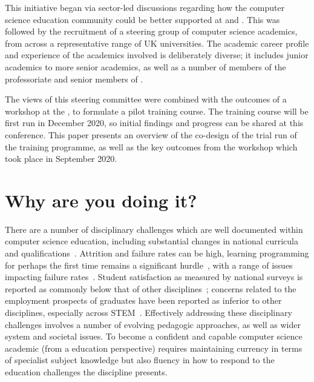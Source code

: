 \documentclass[sigconf]{acmart}
\begin{document}
This initiative began via sector-led discussions regarding how the computer science education community could be better supported at  and . This was followed by the recruitment of a steering group of computer science academics, from across a representative range of UK universities. The academic career profile and experience of the academics involved is deliberately diverse; it includes junior academics to more senior academics, as well as a number of members of the professoriate and senior members of . \begin{comment}
content...
The group also includes a number of computer science academics who have been recognised as National Teaching Fellows by Advance HE. 
\end{comment}
The views of this steering committee were combined with the outcomes of a workshop at the , to formulate a pilot training course. The training course will be first run in December 2020, so initial findings and progress can be shared at this conference. This paper presents an overview of the co-design of the trial run of the training programme, as well as the key outcomes from the workshop which took place in September 2020.


\section{Why are you doing it?}
There are a number of disciplinary challenges which are well documented within computer science education, including substantial changes in national curricula and qualifications~\cite{brown-et-al-toce2014}. Attrition and failure rates can be high, learning programming for perhaps the first time remains a significant hurdle~\cite{davenport-et-al:latice2016,murphy-et-al:programming2017,simon-et-al:sigcse2018}, with a range of issues impacting failure rates~\cite{Watson:2014:FRI:2591708.2591749,prickett-et-al:iticse2020}. Student satisfaction as measured by national surveys is reported as commonly below that of other disciplines~\cite{Sinclair2015}; concerns related to the employment prospects of graduates have been reported as inferior to other disciplines, especially across STEM~\cite{shadbolt2016shadbolt}. Effectively addressing these disciplinary challenges involves a number of evolving pedagogic approaches, as well as wider system and societal issues. To become a confident and capable computer science academic (from a education perspective) requires maintaining currency in terms of specialist subject knowledge but also fluency in how to respond to the education challenges the discipline presents. %
\end{document}
